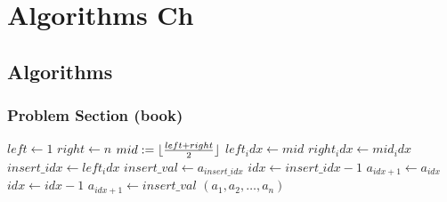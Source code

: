 \chapter{Algorithms Ch}

\section{Algorithms}

\subsection{Problem Section (book)}

\begin{exercise}{49}
    
\end{exercise}

\begin{exercise}{51}
    \begin{algorithmic}
            \State $left \gets 1$
            \State $right \gets n$
                \State $mid := \lfloor\frac{left + right}{2}\rfloor$
                    \State $left_idx \gets mid$
                \Else
                    \State $right_idx \gets mid_idx$
                \EndIf
            \EndWhile
            \State $insert\_idx \gets left_idx$
            \State $insert\_val \gets a_{insert\_idx}$
            \State $idx \gets insert\_idx - 1$
                \State $a_{idx + 1} \gets a_{idx}$
                \State $idx \gets idx - 1$
            \EndWhile
            \State $a_{idx + 1} \gets insert\_val$
            \State \Return $(a_1, a_2, \ldots, a_n)$
        \EndFunction
    \end{algorithmic}
\end{exercise}
